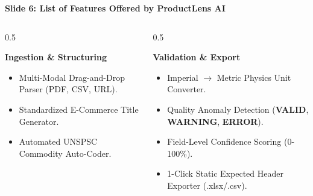 \documentclass[aspectratio=169, 10pt]{beamer}
\begin{document}
\begin{frame}{\textbf{Slide 6: List of Features Offered by ProductLens AI}}
  \begin{columns}
    \begin{column}{0.5\textwidth}
      \begin{block}{\textbf{Ingestion \& Structuring}}
        \begin{itemize}
          \item Multi-Modal Drag-and-Drop Parser (PDF, CSV, URL).
          \item Standardized E-Commerce Title Generator.
          \item Automated UNSPSC Commodity Auto-Coder.
        \end{itemize}
      \end{block}
    \end{column}

    \begin{column}{0.5\textwidth}
      \begin{block}{\textbf{Validation \& Export}}
        \begin{itemize}
          \item Imperial $\rightarrow$ Metric Physics Unit Converter.
          \item Quality Anomaly Detection (\textbf{VALID}, \textbf{WARNING}, \textbf{ERROR}).
          \item Field-Level Confidence Scoring (0-100\%).
          \item 1-Click Static Expected Header Exporter (.xlsx/.csv).
        \end{itemize}
      \end{block}
    \end{column}
  \end{columns}
\end{frame}
\end{document}
